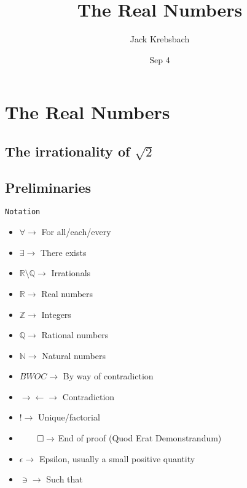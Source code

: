 \documentclass{article}
\title{The Real Numbers}
\author{Jack Krebsbach }
\date{Sep 4}
\begin{document}
\maketitle

\section{The Real Numbers}


\subsection{The irrationality of $\sqrt{2}$}

\subsection{Preliminaries}

\texttt{Notation}
\begin{multicols}{2}
\begin{itemize}
  \item $\forall \rightarrow$ For all/each/every
  \item $\exists \rightarrow$ There exists
  \item $\mathbb{R} \setminus \mathbb{Q} \rightarrow$ Irrationals
  \item $\mathbb{R} \rightarrow$ Real numbers
  \item $\mathbb{Z} \rightarrow$ Integers
  \item $\mathbb{Q} \rightarrow$ Rational numbers
  \item $\mathbb{N} \rightarrow$ Natural numbers
  \item $BWOC \rightarrow$ By way of contradiction
  \item $\rightarrow\!\leftarrow \rightarrow$ Contradiction
  \item $! \rightarrow$ Unique/factorial
  \item $\qed \rightarrow$ End of proof (Quod Erat Demonstrandum)
  \item $\epsilon \rightarrow$ Epsilon, usually a small positive quantity
  \item $\ni \rightarrow$ Such that
\end{itemize}
\end{multicols}
\end{document}
